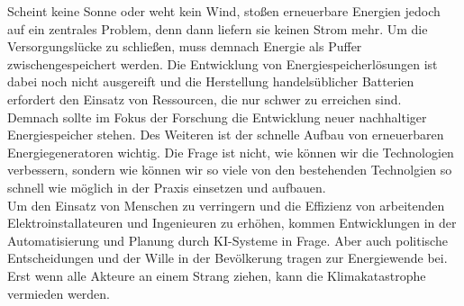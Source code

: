   Scheint keine Sonne oder weht kein Wind, stoßen  erneuerbare Energien jedoch auf ein zentrales Problem, denn dann liefern sie keinen Strom mehr. Um die Versorgungslücke zu schließen, muss demnach Energie als Puffer zwischengespeichert werden. Die Entwicklung von Energiespeicherlösungen ist dabei noch nicht ausgereift und die Herstellung handelsüblicher Batterien erfordert den Einsatz von Ressourcen, die nur schwer zu erreichen sind.\\
  Demnach sollte im Fokus der Forschung die Entwicklung neuer nachhaltiger Energiespeicher stehen. Des Weiteren ist der schnelle Aufbau von erneuerbaren Energiegeneratoren wichtig. Die Frage ist nicht, wie können wir die Technologien verbessern, sondern wie können wir so viele von den bestehenden Technolgien so schnell wie möglich in der Praxis einsetzen und aufbauen.\\
  Um den Einsatz von Menschen zu verringern und die Effizienz von arbeitenden Elektroinstallateuren und Ingenieuren zu erhöhen, kommen Entwicklungen in der Automatisierung und Planung durch KI-Systeme in Frage. Aber auch politische Entscheidungen und der Wille in der Bevölkerung tragen zur Energiewende bei. Erst wenn alle Akteure an einem Strang ziehen, kann die Klimakatastrophe vermieden werden.
